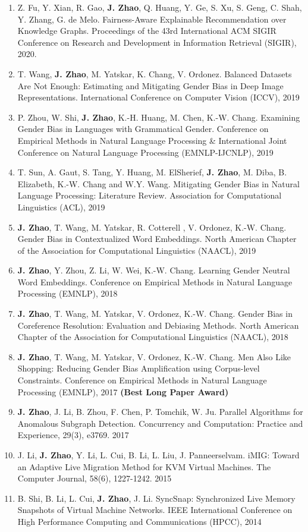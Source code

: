 \documentclass[11pt, a4paper]{article}
\begin{document}
\begin{enumerate}
	\item Z. Fu, Y. Xian, R. Gao, \textbf{J. Zhao}, Q. Huang, Y. Ge, S. Xu, S. Geng, C. Shah, Y. Zhang, G. de Melo. Fairness-Aware Explainable Recommendation over Knowledge Graphs.  Proceedings of the 43rd International ACM SIGIR Conference on Research and Development in Information Retrieval (SIGIR), 2020.
	\item T. Wang, \textbf{J. Zhao},  M. Yatskar, K. Chang, V. Ordonez. Balanced Datasets Are Not Enough: Estimating and Mitigating Gender Bias in Deep Image Representations. International Conference on Computer Vision (ICCV), 2019
	\item P. Zhou, W. Shi, \textbf{J. Zhao}, K.-H. Huang, M. Chen, K.-W. Chang. Examining Gender Bias in Languages with Grammatical Gender. Conference on Empirical Methods in Natural Language Processing \& International Joint Conference on Natural Language Processing (EMNLP-IJCNLP), 2019
	\item T. Sun, A. Gaut, S. Tang, Y. Huang, M. ElSherief, \textbf{J. Zhao}, M. Diba, B. Elizabeth, K.-W. Chang and W.Y. Wang. Mitigating Gender Bias in Natural Language Processing: Literature Review. Association for Computational Linguistics (ACL), 2019
	\item \textbf{J. Zhao}, T. Wang, M. Yatskar, R. Cotterell , V. Ordonez, K.-W. Chang. Gender Bias in Contextualized Word Embeddings. North American Chapter of the Association for Computational Linguistics (NAACL), 2019
	\item \textbf{J. Zhao}, Y. Zhou, Z. Li, W. Wei, K.-W. Chang. Learning Gender Neutral Word Embeddings. Conference on Empirical Methods in Natural Language Processing (EMNLP), 2018
	\item \textbf{J. Zhao}, T. Wang, M. Yatskar, V. Ordonez, K.-W. Chang. Gender Bias in Coreference Resolution: Evaluation and Debiasing Methods. North American Chapter of the Association for Computational Linguistics (NAACL), 2018
	\item \textbf{J. Zhao}, T. Wang, M. Yatskar, V. Ordonez, K.-W. Chang. Men Also Like Shopping: Reducing Gender Bias Amplification using Corpus-level Constraints. Conference on Empirical Methods in Natural Language Processing (EMNLP), 2017 {\color{red}\textbf{(Best Long Paper Award)}}
	\item \textbf{J. Zhao}, J. Li, B. Zhou, F. Chen, P. Tomchik, W. Ju. Parallel Algorithms for Anomalous Subgraph Detection. Concurrency and Computation: Practice and Experience, 29(3), e3769. 2017
	\item J. Li, \textbf{J. Zhao}, Y. Li, L. Cui, B. Li, L. Liu, J. Panneerselvam. iMIG: Toward an Adaptive Live Migration Method for KVM Virtual Machines. The Computer Journal, 58(6), 1227-1242. 2015
	\item B. Shi, B. Li, L. Cui, \textbf{J. Zhao}, J. Li. SyncSnap: Synchronized Live Memory Snapshots of Virtual Machine Networks. IEEE International Conference on High Performance Computing and Communications (HPCC), 2014
\end{enumerate}
\end{document}
